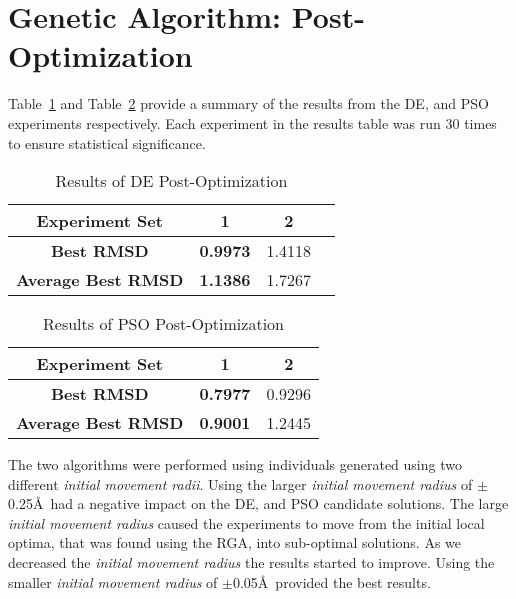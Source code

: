 \section{Genetic Algorithm: Post-Optimization}
\label{sec:post-op-analysis}

Table~\ref{table:post-op-de-results} and Table~\ref{table:post-op-pso-results} provide a summary of the results from the DE, and PSO experiments respectively. Each experiment in the results table was run 30 times to ensure statistical significance. 

\begin{table}
	\centering
	\begin{tabular}{ | >{\bfseries}c | c | c | c | }
		\hline
		Experiment Set & 1 & 2 \\ \hline
		Best RMSD & \textbf{0.9973} & 1.4118 \\ \hline
		Average Best RMSD & \textbf{1.1386} & 1.7267 \\ \hline
	\end{tabular}
	\caption{Results of DE Post-Optimization}
	\label{table:post-op-de-results}
\end{table}

\begin{table}
	\centering
	\begin{tabular}{ | >{\bfseries}c | c | c | }
		\hline
		Experiment Set & 1 & 2 \\ \hline
		Best RMSD & \textbf{0.7977} & 0.9296 \\ \hline
		Average Best RMSD & \textbf{0.9001} & 1.2445 \\ \hline
	\end{tabular}
	\caption{Results of PSO Post-Optimization}
	\label{table:post-op-pso-results}
\end{table}

The two algorithms were performed using individuals generated using two different \textit{initial movement radii}. Using the larger \textit{initial movement radius} of $\pm$0.25\AA\ had a negative impact on the DE, and PSO candidate solutions. The large \textit{initial movement radius} caused the experiments to move from the initial local optima, that was found using the RGA, into sub-optimal solutions. As we decreased the \textit{initial movement radius} the results started to improve. Using the smaller \textit{initial movement radius} of $\pm$0.05\AA\ provided the best results.

